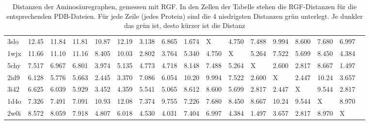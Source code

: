 \documentclass{report}
\begin{document}
\begin{table}[H]
{\begin{tabular}{l l l l l l l l l l l l l l l l l}
3slo & 12.45 & 11.84 & 11.81 & 10.87 & 12.19 & \cellcolor{fGreen!75}3.138 & \cellcolor{fGreen!25}6.865 & \cellcolor{fGreen!100}1.674 &   X   & \cellcolor{fGreen!50}4.750 & 7.488 & 9.994 & 8.600 & 7.680 & 6.997 &  \\
1wjx & 11.66 & 11.10 & 11.16 & 8.405 & 10.03 & \cellcolor{fGreen!100}2.802 & \cellcolor{fGreen!75}3.764 & 5.340 & \cellcolor{fGreen!25}4.750 &   X   & 5.264 & 7.522 & 5.699 & 8.450 & \cellcolor{fGreen!50}4.384 &  \\
5chy & 7.517 & 6.967 & 6.801 & \cellcolor{fGreen!25}3.974 & 5.135 & 4.773 & 4.718 & 8.148 & 7.488 & 5.264 &   X   & \cellcolor{fGreen!75}2.600 & \cellcolor{fGreen!50}2.817 & 8.667 & \cellcolor{fGreen!100}1.497 &  \\
2id9 & 6.128 & 5.776 & 5.663 & \cellcolor{fGreen!100}2.445 & \cellcolor{fGreen!25}3.370 & 7.086 & 6.054 & 10.20 & 9.994 & 7.522 & \cellcolor{fGreen!50}2.600 &   X   & \cellcolor{fGreen!75}2.447 & 10.24 & 3.657 &  \\
3i42 & 6.625 & 6.039 & 5.929 & \cellcolor{fGreen!25}3.452 & 4.359 & 5.541 & 5.065 & 8.612 & 8.600 & 5.699 & \cellcolor{fGreen!75}2.817 & \cellcolor{fGreen!100}2.447 &   X   & 9.544 & \cellcolor{fGreen!50}2.817 &  \\
1d4o & \cellcolor{fGreen!50}7.326 & 7.491 & \cellcolor{fGreen!100}7.091 & 10.93 & 12.08 & \cellcolor{fGreen!25}7.374 & 9.755 & \cellcolor{fGreen!75}7.226 & 7.680 & 8.450 & 8.667 & 10.24 & 9.544 &   X   & 8.970 &  \\
2w0i & 8.572 & 8.059 & 7.918 & 4.807 & 6.018 & 4.530 & \cellcolor{fGreen!25}4.031 & 7.404 & 6.997 & 4.384 & \cellcolor{fGreen!100}1.497 & \cellcolor{fGreen!50}3.657 & \cellcolor{fGreen!75}2.817 & 8.970 &   X   &  \\



\end{tabular}}
\caption{Distanzen der Aminos\"auregraphen, gemessen mit RGF. In den Zellen der Tabelle stehen die RGF-Distanzen f\"ur die entsprechenden PDB-Dateien. F\"ur jede Zeile (jedes Protein) sind die 4 niedrigsten Distanzen gr\"un unterlegt. Je dunkler das gr\"un ist, desto k\"urzer ist die Distanz}
\end{table}
\end{document}

